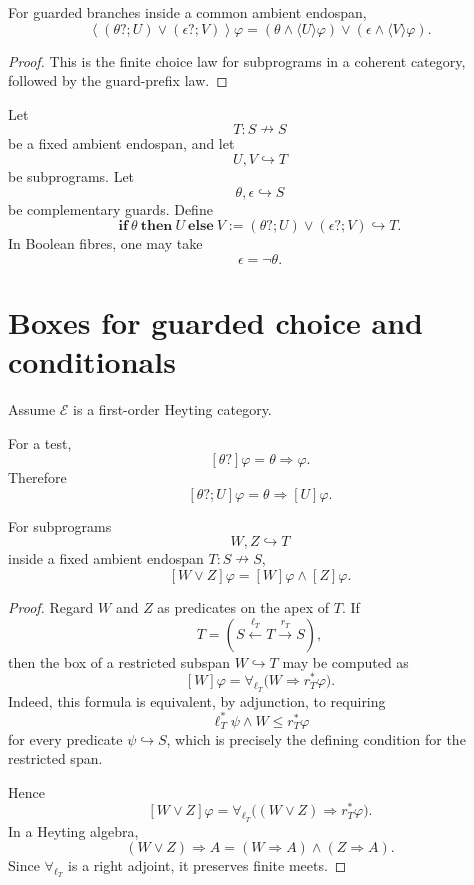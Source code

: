 \begin{proposition}
\label{prop:poly-relative-guarded-choice-diamond}
For guarded branches inside a common ambient endospan,
\[
\left\langle
(\theta?;U)\vee(\epsilon?;V)
\right\rangle\varphi
=
(\theta\wedge\langle U\rangle\varphi)
\vee
(\epsilon\wedge\langle V\rangle\varphi).
\]
\end{proposition}

\begin{proof}
This is the finite choice law for subprograms in a coherent category, followed
by the guard-prefix law.
\end{proof}

\begin{definition}
\label{def:poly-relative-internal-conditional}
Let
\[
T:S\nrightarrow S
\]
be a fixed ambient endospan, and let
\[
U,V\hookrightarrow T
\]
be subprograms.  Let
\[
\theta,\epsilon\hookrightarrow S
\]
be complementary guards.  Define
\[
\mathbf{if}\ \theta\ \mathbf{then}\ U\ \mathbf{else}\ V
:=
(\theta?;U)\vee(\epsilon?;V)
\hookrightarrow T.
\]
In Boolean fibres, one may take
\[
\epsilon=\neg\theta.
\]
\end{definition}

\section{Boxes for guarded choice and conditionals}
\label{sec:poly-relative-boxes-guarded-choice}

Assume \(\mathcal E\) is a first-order Heyting category.

For a test,
\[
[\theta?]\varphi=\theta\Rightarrow\varphi.
\]
Therefore
\[
[\theta?;U]\varphi
=
\theta\Rightarrow[U]\varphi.
\]

\begin{proposition}
\label{prop:poly-relative-box-finite-choice}
For subprograms
\[
W,Z\hookrightarrow T
\]
inside a fixed ambient endospan \(T:S\nrightarrow S\),
\[
[W\vee Z]\varphi
=
[W]\varphi\wedge[Z]\varphi.
\]
\end{proposition}

\begin{proof}
Regard \(W\) and \(Z\) as predicates on the apex of \(T\).  If
\[
T=(S\xleftarrow{\ell_T}T\xrightarrow{r_T}S),
\]
then the box of a restricted subspan \(W\hookrightarrow T\) may be computed as
\[
[W]\varphi
=
\forall_{\ell_T}\bigl(W\Rightarrow r_T^\ast\varphi\bigr).
\]
Indeed, this formula is equivalent, by adjunction, to requiring
\[
\ell_T^\ast\psi\wedge W\le r_T^\ast\varphi
\]
for every predicate \(\psi\hookrightarrow S\), which is precisely the defining
condition for the restricted span.

Hence
\[
[W\vee Z]\varphi
=
\forall_{\ell_T}\bigl((W\vee Z)\Rightarrow r_T^\ast\varphi\bigr).
\]
In a Heyting algebra,
\[
(W\vee Z)\Rightarrow A
=
(W\Rightarrow A)\wedge(Z\Rightarrow A).
\]
Since \(\forall_{\ell_T}\) is a right adjoint, it preserves finite meets.
\end{proof}

